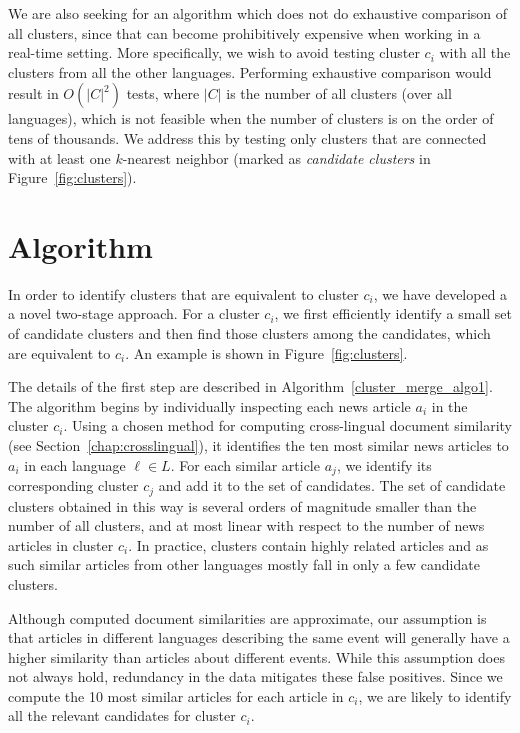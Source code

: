 We are also seeking for an algorithm which does not do exhaustive comparison of all clusters, 
since that can become prohibitively expensive when working in a real-time setting. More specifically, 
we wish to avoid testing cluster $c_i$ with all the clusters from all the other languages. 
Performing exhaustive comparison would result in $O(|C|^2)$ tests, where $|C|$ is the number of all 
clusters (over all languages), which is not feasible when the number of clusters is on the order of tens 
of thousands. We address this by testing only clusters that are connected with at least one $k$-nearest 
neighbor (marked as \emph{candidate clusters} in Figure~\ref{fig:clusters}).

\section{Algorithm}\label{algo:features}

In order to identify clusters that are equivalent to cluster $c_i$, we have developed a 
a novel two-stage approach. For a cluster $c_i$, we first efficiently identify a small set of 
candidate clusters and then find those clusters among the candidates, which are 
equivalent to $c_i$. An example is  shown in  Figure~\ref{fig:clusters}.

The details of the first step are described in Algorithm~\ref{cluster_merge_algo1}. The algorithm 
begins by individually inspecting each news article $a_i$ in the cluster $c_i$. Using a chosen 
method for computing cross-lingual document similarity (see Section~\ref{chap:crosslingual}), it identifies 
the ten most similar news articles to $a_i$ in each language $\ell \in L$. For each similar 
article $a_j$, we identify its corresponding  cluster $c_j$ and add it to the set of candidates. 
The set of candidate clusters obtained in this way is several orders of magnitude smaller than the 
number of all clusters, and at most linear with respect to the number of news articles in 
cluster $c_i$. In practice, clusters contain highly related articles and as such similar 
articles from other languages mostly fall in only a few candidate clusters.

Although computed document similarities are approximate, our  assumption is that articles 
in different languages describing the same event will generally have a higher similarity 
than articles about different events. While this assumption does not always hold, redundancy 
in the data mitigates these false positives. Since we compute the 10 most similar articles 
for each article in $c_i$, we are likely to identify all the relevant candidates for cluster $c_i$.

